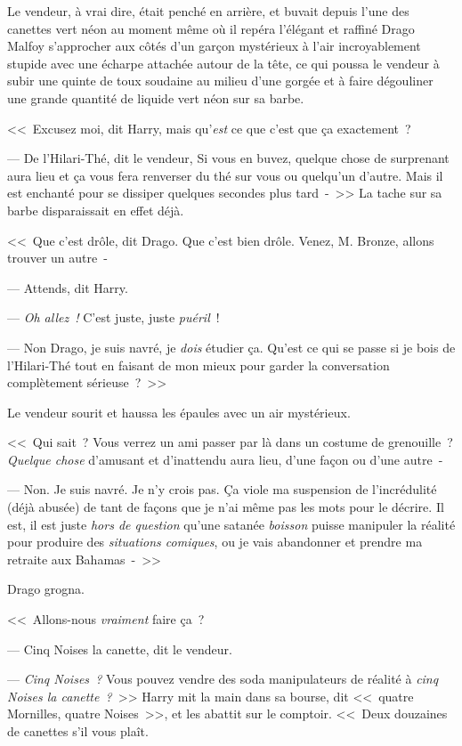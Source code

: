 Le vendeur, à vrai dire, était penché en arrière, et buvait depuis l'une des canettes vert néon au moment même où il repéra l'élégant et raffiné Drago Malfoy s'approcher aux côtés d'un garçon mystérieux à l'air incroyablement stupide avec une écharpe attachée autour de la tête, ce qui poussa le vendeur à subir une quinte de toux soudaine au milieu d'une gorgée et à faire dégouliner une grande quantité de liquide vert néon sur sa barbe.

<<~Excusez moi, dit Harry, mais qu'\emph{est} ce que c'est que ça exactement~?

--- De l'Hilari-Thé, dit le vendeur, Si vous en buvez, quelque chose de surprenant aura lieu et ça vous fera renverser du thé sur vous ou quelqu'un d'autre. Mais il est enchanté pour se dissiper quelques secondes plus tard~-~>> La tache sur sa barbe disparaissait en effet déjà.

<<~Que c'est drôle, dit Drago. Que c'est bien drôle. Venez, M. Bronze, allons trouver un autre~-

--- Attends, dit Harry.

--- \emph{Oh allez~!} C'est juste, juste \emph{puéril}~!

--- Non Drago, je suis navré, je \emph{dois} étudier ça. Qu'est ce qui se passe si je bois de l'Hilari-Thé tout en faisant de mon mieux pour garder la conversation complètement sérieuse~?~>>

Le vendeur sourit et haussa les épaules avec un air mystérieux.

<<~Qui sait~? Vous verrez un ami passer par là dans un costume de grenouille~? \emph{Quelque chose} d'amusant et d'inattendu aura lieu, d'une façon ou d'une autre~-

--- Non. Je suis navré. Je n'y crois pas. Ça viole ma suspension de l'incrédulité (déjà abusée) de tant de façons que je n'ai même pas les mots pour le décrire. Il est, il est juste \emph{hors de question} qu'une satanée \emph{boisson} puisse manipuler la réalité pour produire des \emph{situations comiques}, ou je vais abandonner et prendre ma retraite aux Bahamas~-~>>

Drago grogna.

<<~Allons-nous \emph{vraiment} faire ça~?

--- Cinq Noises la canette, dit le vendeur.

--- \emph{Cinq Noises~?} Vous pouvez vendre des soda manipulateurs de réalité à \emph{cinq Noises la canette~?}~>> Harry mit la main dans sa bourse, dit <<~quatre Mornilles, quatre Noises~>>, et les abattit sur le comptoir. <<~Deux douzaines de canettes s'il vous plaît.

